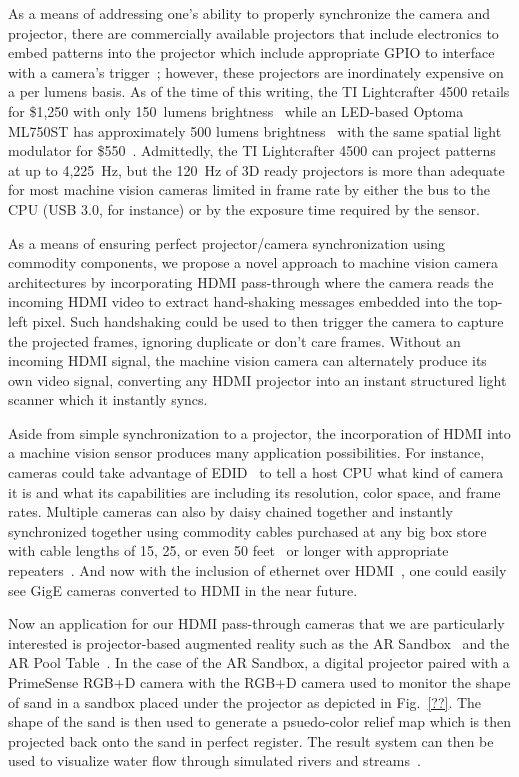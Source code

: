 \documentclass[]{spie}  %
\begin{document}
As a means of addressing one's ability to properly synchronize the camera and projector, there are commercially available projectors that include electronics to embed patterns into the projector which include appropriate GPIO to interface with a camera's trigger~\cite{glop18, ajil18, lcft18}; however, these projectors are inordinately expensive on a per lumens basis.  As of the time of this writing, the TI Lightcrafter 4500 retails for \$1,250 with only 150~lumens brightness~\cite{tilc17} while an LED-based Optoma ML750ST has approximately 500 lumens brightness~\cite{lume70} with the same spatial light modulator for \$550~\cite{ml75st}. Admittedly, the TI Lightcrafter 4500 can project patterns at up to 4,225~Hz, but the 120~Hz of 3D ready projectors is more than adequate for most machine vision cameras limited in frame rate by either the bus to the CPU (USB 3.0, for instance) or by the exposure time required by the sensor.

As a means of ensuring perfect projector/camera synchronization using commodity components, we propose a novel approach to machine vision camera architectures by incorporating HDMI pass-through where the camera reads the incoming HDMI video to extract hand-shaking messages embedded into the top-left pixel. Such handshaking could be used to then trigger the camera to capture the projected frames, ignoring duplicate or don't care frames.  Without an incoming HDMI signal, the machine vision camera can alternately produce its own video signal, converting any HDMI projector into an instant structured light scanner which it instantly syncs.  

Aside from simple synchronization to a projector, the incorporation of HDMI into a machine vision sensor produces many application possibilities. For instance, cameras could take advantage of EDID~\cite{edid00} to tell a host CPU what kind of camera it is and what its capabilities are including its resolution, color space, and frame rates.  Multiple cameras can also by daisy chained together and instantly synchronized together using commodity cables purchased at any big box store with cable lengths of 15, 25, or even 50 feet~\cite{hdmi50} or longer with appropriate repeaters~\cite{repe00}. And now with the inclusion of ethernet over HDMI~\cite{hdmi14}, one could easily see GigE cameras converted to HDMI in the near future.

Now an application for our HDMI pass-through cameras that we are particularly interested is projector-based augmented reality such as the AR Sandbox~\cite{wood16} and the AR Pool Table~\cite{uchi08}. In the case of the AR Sandbox, a digital projector paired with a PrimeSense RGB+D camera with the RGB+D camera used to monitor the shape of sand in a sandbox placed under the projector as depicted in Fig.~\ref{??}.  The shape of the sand is then used to generate a psuedo-color relief map which is then projected back onto the sand in perfect register.  The result system can then be used to visualize water flow through simulated rivers and streams~\cite{afro18}.  
\end{document}
